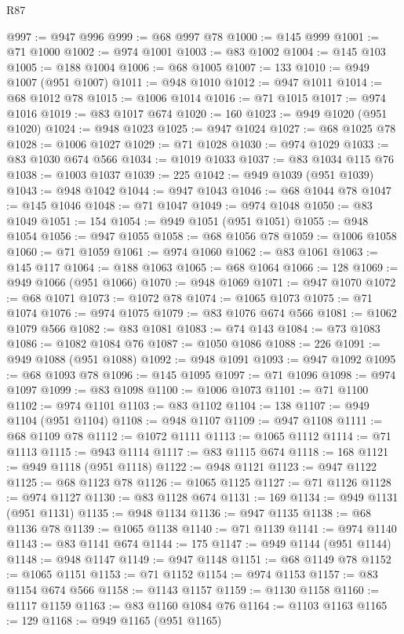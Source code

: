 \begin{lexlean}{R87}
\begin{coremodule}
{{@997 := @947 @996
@999 := @68 @997 @78
@1000 := @145 @999
@1001 := @71 @1000
@1002 := @974 @1001
@1003 := @83 @1002
@1004 := @145 @103
@1005 := @188 @1004
@1006 := @68 @1005
@1007 := 133
@1010 := @949 @1007 (@951 @1007)
@1011 := @948 @1010
@1012 := @947 @1011
@1014 := @68 @1012 @78
@1015 := @1006 @1014
@1016 := @71 @1015
@1017 := @974 @1016
@1019 := @83 @1017 @674
@1020 := 160
@1023 := @949 @1020 (@951 @1020)
@1024 := @948 @1023
@1025 := @947 @1024
@1027 := @68 @1025 @78
@1028 := @1006 @1027
@1029 := @71 @1028
@1030 := @974 @1029
@1033 := @83 @1030 @674 @566
@1034 := @1019 @1033
@1037 := @83 @1034 @115 @76
@1038 := @1003 @1037
@1039 := 225
@1042 := @949 @1039 (@951 @1039)
@1043 := @948 @1042
@1044 := @947 @1043
@1046 := @68 @1044 @78
@1047 := @145 @1046
@1048 := @71 @1047
@1049 := @974 @1048
@1050 := @83 @1049
@1051 := 154
@1054 := @949 @1051 (@951 @1051)
@1055 := @948 @1054
@1056 := @947 @1055
@1058 := @68 @1056 @78
@1059 := @1006 @1058
@1060 := @71 @1059
@1061 := @974 @1060
@1062 := @83 @1061
@1063 := @145 @117
@1064 := @188 @1063
@1065 := @68 @1064
@1066 := 128
@1069 := @949 @1066 (@951 @1066)
@1070 := @948 @1069
@1071 := @947 @1070
@1072 := @68 @1071
@1073 := @1072 @78
@1074 := @1065 @1073
@1075 := @71 @1074
@1076 := @974 @1075
@1079 := @83 @1076 @674 @566
@1081 := @1062 @1079 @566
@1082 := @83 @1081
@1083 := @74 @143
@1084 := @73 @1083
@1086 := @1082 @1084 @76
@1087 := @1050 @1086
@1088 := 226
@1091 := @949 @1088 (@951 @1088)
@1092 := @948 @1091
@1093 := @947 @1092
@1095 := @68 @1093 @78
@1096 := @145 @1095
@1097 := @71 @1096
@1098 := @974 @1097
@1099 := @83 @1098
@1100 := @1006 @1073
@1101 := @71 @1100
@1102 := @974 @1101
@1103 := @83 @1102
@1104 := 138
@1107 := @949 @1104 (@951 @1104)
@1108 := @948 @1107
@1109 := @947 @1108
@1111 := @68 @1109 @78
@1112 := @1072 @1111
@1113 := @1065 @1112
@1114 := @71 @1113
@1115 := @943 @1114
@1117 := @83 @1115 @674
@1118 := 168
@1121 := @949 @1118 (@951 @1118)
@1122 := @948 @1121
@1123 := @947 @1122
@1125 := @68 @1123 @78
@1126 := @1065 @1125
@1127 := @71 @1126
@1128 := @974 @1127
@1130 := @83 @1128 @674
@1131 := 169
@1134 := @949 @1131 (@951 @1131)
@1135 := @948 @1134
@1136 := @947 @1135
@1138 := @68 @1136 @78
@1139 := @1065 @1138
@1140 := @71 @1139
@1141 := @974 @1140
@1143 := @83 @1141 @674
@1144 := 175
@1147 := @949 @1144 (@951 @1144)
@1148 := @948 @1147
@1149 := @947 @1148
@1151 := @68 @1149 @78
@1152 := @1065 @1151
@1153 := @71 @1152
@1154 := @974 @1153
@1157 := @83 @1154 @674 @566
@1158 := @1143 @1157
@1159 := @1130 @1158
@1160 := @1117 @1159
@1163 := @83 @1160 @1084 @76
@1164 := @1103 @1163
@1165 := 129
@1168 := @949 @1165 (@951 @1165)
}}
\end{coremodule}
\end{lexlean}
